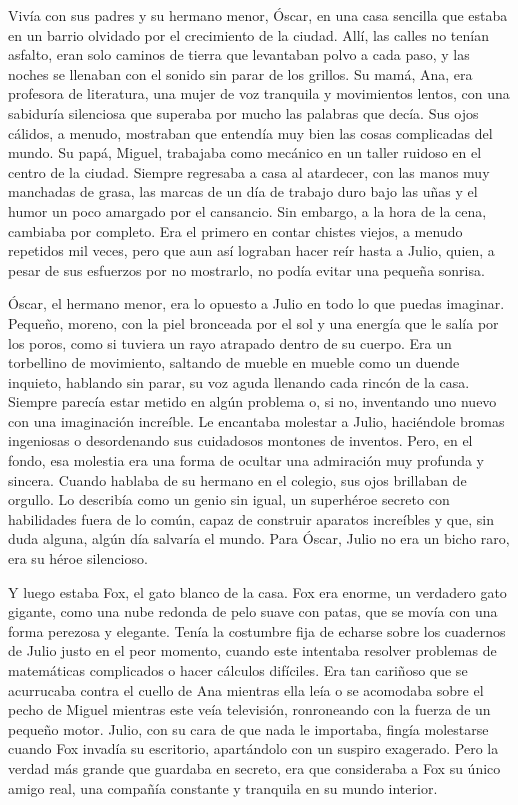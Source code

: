 \documentclass[a4paper,12pt]{book}
\begin{document}
Vivía con sus padres y su hermano menor, Óscar, en una casa sencilla que estaba en un barrio olvidado por el crecimiento de la ciudad. Allí, las calles no tenían asfalto, eran solo caminos de tierra que levantaban polvo a cada paso, y las noches se llenaban con el sonido sin parar de los grillos. Su mamá, Ana, era profesora de literatura, una mujer de voz tranquila y movimientos lentos, con una sabiduría silenciosa que superaba por mucho las palabras que decía. Sus ojos cálidos, a menudo, mostraban que entendía muy bien las cosas complicadas del mundo. Su papá, Miguel, trabajaba como mecánico en un taller ruidoso en el centro de la ciudad. Siempre regresaba a casa al atardecer, con las manos muy manchadas de grasa, las marcas de un día de trabajo duro bajo las uñas y el humor un poco amargado por el cansancio. Sin embargo, a la hora de la cena, cambiaba por completo. Era el primero en contar chistes viejos, a menudo repetidos mil veces, pero que aun así lograban hacer reír hasta a Julio, quien, a pesar de sus esfuerzos por no mostrarlo, no podía evitar una pequeña sonrisa.

Óscar, el hermano menor, era lo opuesto a Julio en todo lo que puedas imaginar. Pequeño, moreno, con la piel bronceada por el sol y una energía que le salía por los poros, como si tuviera un rayo atrapado dentro de su cuerpo. Era un torbellino de movimiento, saltando de mueble en mueble como un duende inquieto, hablando sin parar, su voz aguda llenando cada rincón de la casa. Siempre parecía estar metido en algún problema o, si no, inventando uno nuevo con una imaginación increíble. Le encantaba molestar a Julio, haciéndole bromas ingeniosas o desordenando sus cuidadosos montones de inventos. Pero, en el fondo, esa molestia era una forma de ocultar una admiración muy profunda y sincera. Cuando hablaba de su hermano en el colegio, sus ojos brillaban de orgullo. Lo describía como un genio sin igual, un superhéroe secreto con habilidades fuera de lo común, capaz de construir aparatos increíbles y que, sin duda alguna, algún día salvaría el mundo. Para Óscar, Julio no era un bicho raro, era su héroe silencioso.

Y luego estaba Fox, el gato blanco de la casa. Fox era enorme, un verdadero gato gigante, como una nube redonda de pelo suave con patas, que se movía con una forma perezosa y elegante. Tenía la costumbre fija de echarse sobre los cuadernos de Julio justo en el peor momento, cuando este intentaba resolver problemas de matemáticas complicados o hacer cálculos difíciles. Era tan cariñoso que se acurrucaba contra el cuello de Ana mientras ella leía o se acomodaba sobre el pecho de Miguel mientras este veía televisión, ronroneando con la fuerza de un pequeño motor. Julio, con su cara de que nada le importaba, fingía molestarse cuando Fox invadía su escritorio, apartándolo con un suspiro exagerado. Pero la verdad más grande que guardaba en secreto, era que consideraba a Fox su único amigo real, una compañía constante y tranquila en su mundo interior.
\end{document}
